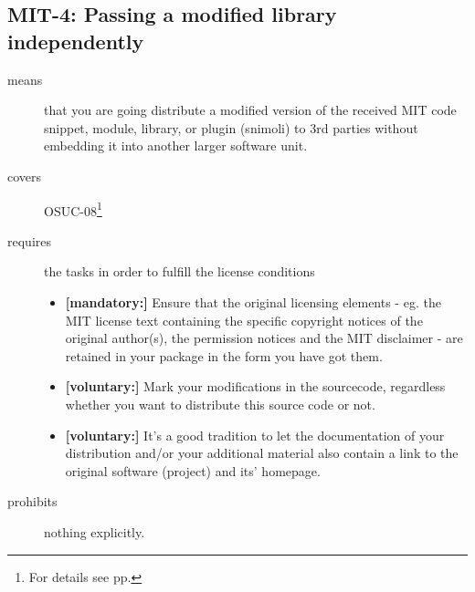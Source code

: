 \subsection{MIT-4: Passing a modified library independently}
\label{OSUC-08-MIT}
\begin{description}
\item[means] that you are going distribute a modified version of the received
MIT code snippet, module, library, or plugin (snimoli) to 3rd parties without
embedding it into another larger software unit.
\item[covers] OSUC-08\footnote{For details see pp. \pageref{OSUC-08-DEF}}
\item[requires] the tasks in order to fulfill the license conditions
\begin{itemize}
  \item \textbf{[mandatory:]} Ensure that the original licensing elements - eg.
  the MIT license text containing the specific copyright notices of the original
  author(s), the permission notices and the MIT disclaimer - are retained in
  your package in the form you have got them.
  \item \textbf{[voluntary:]} Mark your modifications in the sourcecode,
  regardless whether you want to distribute this source code or not.
  \item \textbf{[voluntary:]} It's a good tradition to let the documentation of
  your distribution and/or your additional material also contain a link to the
  original software (project) and its' homepage.
\end{itemize}
\item[prohibits] nothing explicitly.
\end{description}


